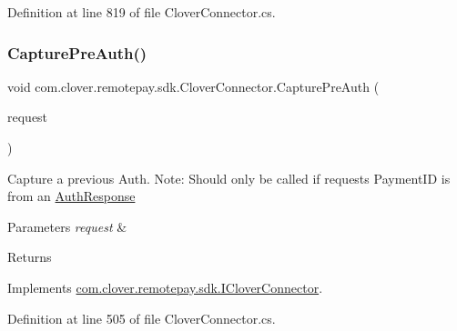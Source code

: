 Definition at line 819 of file Clover\+Connector.\+cs.

\mbox{\label{classcom_1_1clover_1_1remotepay_1_1sdk_1_1_clover_connector_a7323abfe34b1fee5634dd7e1296633cb}} 
\subsubsection{\texorpdfstring{Capture\+Pre\+Auth()}{CapturePreAuth()}}
{\footnotesize\ttfamily void com.\+clover.\+remotepay.\+sdk.\+Clover\+Connector.\+Capture\+Pre\+Auth (\begin{DoxyParamCaption}\item[{\hyperlink{classcom_1_1clover_1_1remotepay_1_1sdk_1_1_capture_pre_auth_request}{Capture\+Pre\+Auth\+Request}}]{request }\end{DoxyParamCaption})}



Capture a previous Auth. Note\+: Should only be called if request\textquotesingle{}s Payment\+ID is from an \hyperlink{classcom_1_1clover_1_1remotepay_1_1sdk_1_1_auth_response}{Auth\+Response} 


\begin{DoxyParams}{Parameters}
{\em request} & \\
\hline
\end{DoxyParams}
\begin{DoxyReturn}{Returns}

\end{DoxyReturn}


Implements \hyperlink{interfacecom_1_1clover_1_1remotepay_1_1sdk_1_1_i_clover_connector_a1687202a30277f4ae5dffd73b9311b94}{com.\+clover.\+remotepay.\+sdk.\+I\+Clover\+Connector}.



Definition at line 505 of file Clover\+Connector.\+cs.

\mbox{\label{classcom_1_1clover_1_1remotepay_1_1sdk_1_1_clover_connector_aa8348f5f0769ad3023858d310e5aa847}} 
